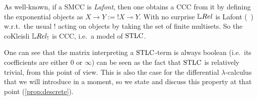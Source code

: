 
\begin{comment}

In order to interpret the full $\STLC$, we need a Cartesian closed category (CCC).
It is well-known \cite{Mellies2009} that it is always possible to construct a CCC by taking the \emph{co-Kleisli} $\C C_!$ of a so-called \emph{Lafont category} $\C C$.
A SMCC is Lafont when it has finite products and it is equipped with a comonad $!$ (its \emph{Lafont exponential}) which, at level of objects, sends $X$ to an object $!X$ being the free commutative comonoid on $X$.
Such objects $!X$ represent the \emph{bang} connective of linear logic, granting infinite duplications via the infinite product $X^0\otimes X\otimes X^2\otimes X^3\otimes\cdots$, each factor representing a possible number of duplications.
It is well-known that, under mild conditions satisfied by $\QREL$, one can explicit this idea via the fact that the map $X\mapsto \finMS{X}$ (where $\finMS{X}$ is the set of finite multi-sets on $X$) lifts to a functor $!:\QREL\to\QREL$ which is a Lafont-exponential comonad.
Specializing [Corollary III.6, \cite{Manzo2013}] to our case, we have:

\begin{proposition}
 $\LREL$ is Lafont.
\end{proposition}

\end{comment}

As well-known, if a SMCC is \emph{Lafont}, then one obtains a CCC from it by defining the exponential objects as $X\to Y:=!X \multimap Y$.
With no surprise $\LREL$ is Lafont (~\cite[Corollary III.6]{Manzo2013}) %
w.r.t.\ the usual $!$ acting on objects by taking the set of finite multisets.
So the coKleisli $\LREL_!$ is CCC, i.e.\ a model of $\mathrm{STLC}$.

One can see that the matrix interpreting a $\mathrm{STLC}$-term is always boolean (i.e.\ its coefficients are either $0$ or $\infty$) can be seen as the fact that $\mathrm{STLC}$ is relatively trivial, from this point of view.
This is also the case for the differential $\lambda$-calculus that we will introduce in a moment, so we state and discuss this property at that point (\autoref{prop:descrete}).

